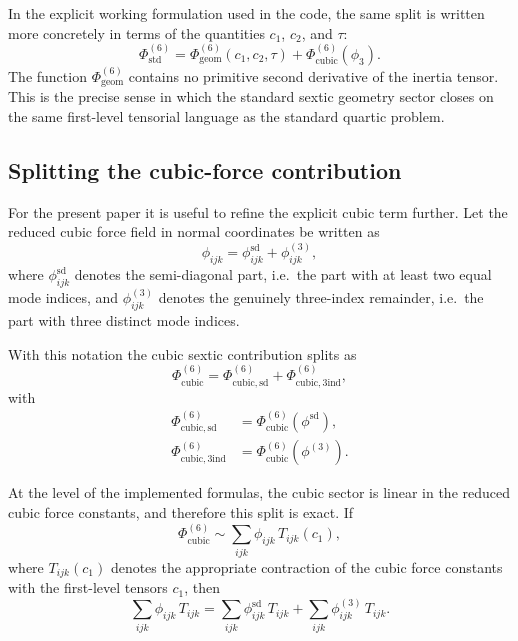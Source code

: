\documentclass[aip,jcp,reprint,floatfix]{revtex4-2}
\begin{document}
In the explicit working formulation used in the code, the same split is
written more concretely in terms of the quantities $c_1$, $c_2$, and $\tau$:
\begin{equation}
\Phi^{(6)}_{\mathrm{std}}
=
\Phi^{(6)}_{\mathrm{geom}}(c_1,c_2,\tau)
+
\Phi^{(6)}_{\mathrm{cubic}}(\phi_3).
\label{eq:app_sextic_std_split_c1c2}
\end{equation}
The function $\Phi^{(6)}_{\mathrm{geom}}$ contains no primitive second
derivative of the inertia tensor. This is the precise sense in which the
standard sextic geometry sector closes on the same first-level tensorial
language as the standard quartic problem.

\subsection{Splitting the cubic-force contribution}

For the present paper it is useful to refine the explicit cubic term further.
Let the reduced cubic force field in normal coordinates be written as
\begin{equation}
\phi_{ijk}
=
\phi^{\mathrm{sd}}_{ijk}
+
\phi^{(3)}_{ijk},
\label{eq:app_phi3_split}
\end{equation}
where $\phi^{\mathrm{sd}}_{ijk}$ denotes the semi-diagonal part, i.e.\ the
part with at least two equal mode indices, and $\phi^{(3)}_{ijk}$ denotes the
genuinely three-index remainder, i.e.\ the part with three distinct mode
indices.

With this notation the cubic sextic contribution splits as
\begin{equation}
\Phi^{(6)}_{\mathrm{cubic}}
=
\Phi^{(6)}_{\mathrm{cubic,sd}}
+
\Phi^{(6)}_{\mathrm{cubic,3ind}},
\label{eq:app_sextic_cubic_split}
\end{equation}
with
\begin{align}
\Phi^{(6)}_{\mathrm{cubic,sd}}
&=
\Phi^{(6)}_{\mathrm{cubic}}(\phi^{\mathrm{sd}}),
\\
\Phi^{(6)}_{\mathrm{cubic,3ind}}
&=
\Phi^{(6)}_{\mathrm{cubic}}(\phi^{(3)}).
\end{align}

At the level of the implemented formulas, the cubic sector is linear in the
reduced cubic force constants, and therefore this split is exact. If
\begin{equation}
\Phi^{(6)}_{\mathrm{cubic}}
\sim
\sum_{ijk}\phi_{ijk}\,T_{ijk}(c_1),
\end{equation}
where $T_{ijk}(c_1)$ denotes the appropriate contraction of the cubic force
constants with the first-level tensors $c_1$, then
\begin{equation}
\sum_{ijk}\phi_{ijk}\,T_{ijk}
=
\sum_{ijk}\phi^{\mathrm{sd}}_{ijk}\,T_{ijk}
+
\sum_{ijk}\phi^{(3)}_{ijk}\,T_{ijk}.
\label{eq:app_sextic_cubic_linear_split}
\end{equation}
\end{document}
